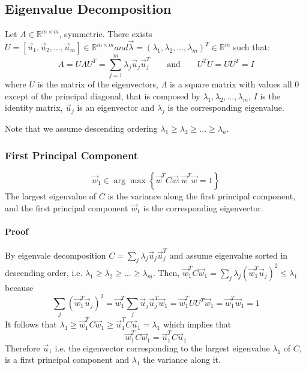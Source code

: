 \subsection{Eigenvalue Decomposition}
Let \(A \in \mathbb{R}^{m \times m}\), symmetric. There exists \(U = \left[ \vec{u}_1, \vec{u}_2, ..., \vec{u}_m \right] \in \mathbb{R}^{m \times m} and \vec{\lambda} = (\lambda_1, \lambda_2, ..., \lambda_m)^T \in \mathbb{R}^{m}\) such that:
\begin{equation}
    A = U \Lambda U^T = \sum_{j=1}^m \lambda_j \vec{u}_j \vec{u}_j^T \qquad \text{and} \qquad U^T U = UU^T = I
\end{equation}
where \(U\) is the matrix of the eigenvectors, \(\Lambda\) is a square matrix with values all 0 except of the principal diagonal, that is composed by \(\lambda_1, \lambda_2, ..., \lambda_m\), \(I\) is the identity matrix, \(\vec{u}_j\) is an eigenvector and \(\lambda_j\) is the corresponding eigenvalue. 

Note that we assume descending ordering \(\lambda_1 \geq \lambda_2 \geq ... \geq \lambda_n\).

\subsubsection{First Principal Component}
\begin{equation}
    \vec{w}_1 \in \arg \max \left\{ \vec{w}^T C \vec{w} : \vec{w}^T \vec{w} = 1 \right\}
\end{equation}
The largest eigenvalue of \(C\) is the variance along the first principal component, and the first principal component \(\vec{w}_1\) is the corresponding eigenvector.

\paragraph{Proof}
By eigenvale decomposition \(C = \sum_j \lambda_j \vec{u}_j \vec{u}_j^T\) and assume eigenvalue sorted in descending order, i.e. \(\lambda_1 \geq \lambda_2 \geq ... \geq \lambda_m\). Then, \(\vec{w}_1^T C \vec{w}_1 = \sum_j \lambda_j (\vec{w}_1^T \vec{u}_j)^2 \leq \lambda_1\) because
\begin{equation*}
    \sum_j (\vec{w}_1^T \vec{u}_j)^2 = \vec{w}_1^T \sum_j \vec{u}_j \vec{u}_j^T \vec{w}_1 = \vec{w}_1^T UU^T \vec{w}_1 = \vec{w}_1^T \vec{w}_1 = 1
\end{equation*}
It follows that \(\lambda_1 \geq \vec{w}_1^T C \vec{w}_1 \geq \vec{u}_1^T C \vec{u}_1 = \lambda_1\) which implies that 
\begin{equation*}
    \vec{w}_1^T C \vec{w}_1 = \vec{u}_1^T C \vec{u}_1
\end{equation*}
Therefore \(\vec{u}_1\) i.e. the eigenvector corresponding to the largest eigenvalue \(\lambda_1\) of \(C\), is a first principal component and \(\lambda_1\) the variance along it.

